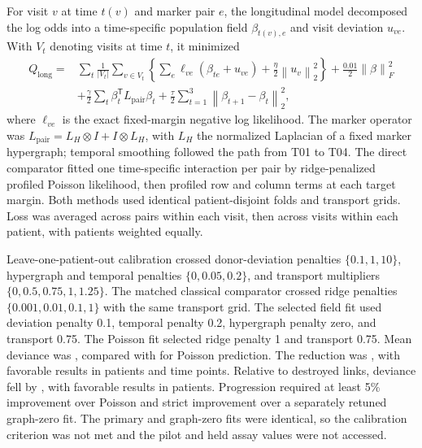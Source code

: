 \documentclass[10pt,a4paper]{article}
\newcommand{\norm}[1]{\left\lVert#1\right\rVert}
\begin{document}
For visit $v$ at time $t(v)$ and marker pair $e$, the longitudinal model decomposed the log odds into a time-specific population field $\beta_{t(v),e}$ and visit deviation $u_{ve}$. With $V_t$ denoting visits at time $t$, it minimized
\begin{equation}
\begin{aligned}
Q_{\mathrm{long}}={}&\sum_t\frac{1}{|V_t|}\sum_{v\in V_t}
\left\{\sum_e\ell_{ve}(\beta_{te}+u_{ve})
+\frac{\eta}{2}\norm{u_v}_2^2\right\}
+\frac{0.01}{2}\norm{\beta}_F^2\\
&+\frac{\gamma}{2}\sum_t\beta_t^{\mathsf T}L_{\mathrm{pair}}\beta_t
+\frac{\tau}{2}\sum_{t=1}^{3}\norm{\beta_{t+1}-\beta_t}_2^2,
\end{aligned}
\label{eq:s-longitudinal-objective}
\end{equation}
where $\ell_{ve}$ is the exact fixed-margin negative log likelihood. The marker operator was $L_{\mathrm{pair}}=L_H\otimes I+I\otimes L_H$, with $L_H$ the normalized Laplacian of a fixed marker hypergraph; temporal smoothing followed the path from T01 to T04. The direct comparator fitted one time-specific interaction per pair by ridge-penalized profiled Poisson likelihood, then profiled row and column terms at each target margin. Both methods used identical patient-disjoint folds and transport grids. Loss was averaged across pairs within each visit, then across visits within each patient, with patients weighted equally.

Leave-one-patient-out calibration crossed donor-deviation penalties $\{0.1,1,10\}$, hypergraph and temporal penalties $\{0,0.05,0.2\}$, and transport multipliers $\{0,0.5,0.75,1,1.25\}$. The matched classical comparator crossed ridge penalties $\{0.001,0.01,0.1,1\}$ with the same transport grid. The selected field fit used deviation penalty 0.1, temporal penalty 0.2, hypergraph penalty zero, and transport 0.75. The Poisson fit selected ridge penalty 1 and transport 0.75. Mean deviance was \GSEThreeOneSevenPrimaryLoss{}, compared with \GSEThreeOneSevenPoissonLoss{} for Poisson prediction. The reduction was \GSEThreeOneSevenPoissonReduction{}, with favorable results in \GSEThreeOneSevenPoissonFav{} patients and \GSEThreeOneSevenTimeFav{} time points. Relative to destroyed links, deviance fell by \GSEThreeOneSevenDestroyedReduction{}, with favorable results in \GSEThreeOneSevenDestroyedFav{} patients. Progression required at least 5\% improvement over Poisson and strict improvement over a separately retuned graph-zero fit. The primary and graph-zero fits were identical, so the calibration criterion was not met and the pilot and held assay values were not accessed.
\end{document}

